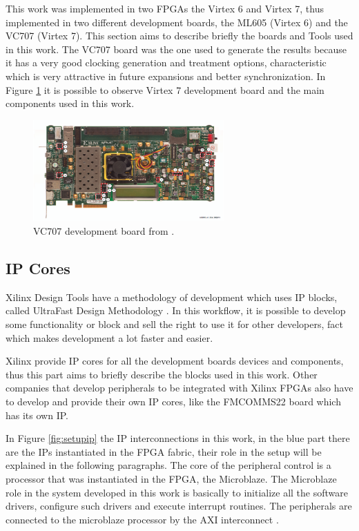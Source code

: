 This work was implemented in two FPGAs the Virtex 6 and Virtex 7, thus
implemented in two different development boards, the ML605 (Virtex 6) and the
VC707 (Virtex 7). This section aims to describe briefly the boards and Tools
used in this work. The VC707 board was the one used to generate the results
because it has a very good clocking generation and treatment options,
characteristic which is very attractive in future expansions and better
synchronization. In Figure \ref{fig:vc707} it is possible to observe Virtex 7
development board and the main components used in this work.

\begin{figure}[htbp]
    \centering
    \includegraphics[width=0.65\textwidth]{./figures/vc707}
    \caption{ VC707 development board from \cite{xilinx:vc707}.
    \label{fig:vc707}}
\end{figure}

\subsection{IP Cores}

Xilinx Design Tools have a methodology of development which uses IP blocks,
called UltraFast Design Methodology \cite{xilinx:ultrafast}. In this workflow,
it is possible to develop some functionality or block and sell the right to use
it for other developers, fact which makes development a lot faster and easier.

Xilinx provide IP cores for all the development boards devices and components,
thus this part aims to briefly describe the blocks used in this work. Other
companies that develop peripherals to be integrated with Xilinx FPGAs also have
to develop and provide their own IP cores, like the FMCOMMS22 board which has its
own IP.

In Figure \ref{fig:setupip} the IP interconnections in this work, in the blue
part there are the IPs instantiated in the FPGA fabric, their role in the setup
will be explained in the following paragraphs. The core of the peripheral
control is a processor that was instantiated in the FPGA, the Microblaze. The
Microblaze role in the system developed in this work is basically to initialize
all the software drivers, configure such drivers and execute interrupt
routines. The peripherals are connected to the microblaze processor by the AXI
interconnect \cite{xilinx:axiconn}.


